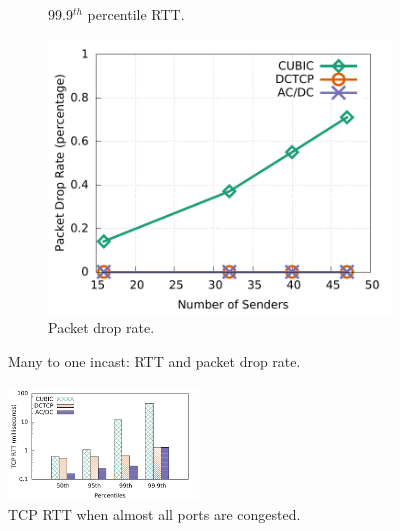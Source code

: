 \begin{figure}[!t]
\begin{subfigure}[b]{0.33\textwidth}
                \caption{99.9$^{th}$ percentile RTT.}
                \label{incast_9k_999th_sockperf}
        \end{subfigure}
        \begin{subfigure}[b]{0.33\textwidth}
                \centering
                \includegraphics[width=\textwidth]{figures/incast/plots9k/incast_droprate_vary_sender.pdf}
                \caption{Packet drop rate.}
                \label{incast_9k_droprate}
        \end{subfigure}
        \caption{Many to one incast: RTT and packet drop rate.}
        \label{incast_9k_sockperf_droprate}
\end{figure}


\begin{figure}[t]
        \centering
  \includegraphics[width=0.45\textwidth]{figures/incast/pressure/incast_pressure_compare_sockperf.pdf}
        \caption{TCP RTT when almost all ports are congested.}
        \label{sockperf_pressure_incast}
\end{figure}

%
%

